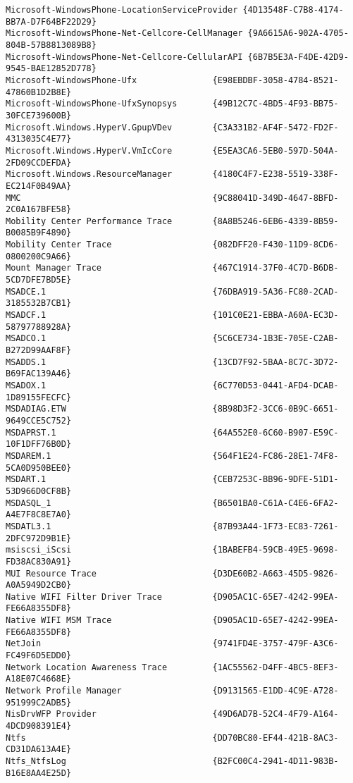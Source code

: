 \documentclass{report}
\begin{document}
\begin{lstlisting}[breaklines=true,basicstyle=\tiny]
Microsoft-WindowsPhone-LocationServiceProvider {4D13548F-C7B8-4174-BB7A-D7F64BF22D29}
Microsoft-WindowsPhone-Net-Cellcore-CellManager {9A6615A6-902A-4705-804B-57B8813089B8}
Microsoft-WindowsPhone-Net-Cellcore-CellularAPI {6B7B5E3A-F4DE-42D9-9545-BAE12852D778}
Microsoft-WindowsPhone-Ufx               {E98EBDBF-3058-4784-8521-47860B1D2B8E}
Microsoft-WindowsPhone-UfxSynopsys       {49B12C7C-4BD5-4F93-BB75-30FCE739600B}
Microsoft.Windows.HyperV.GpupVDev        {C3A331B2-AF4F-5472-FD2F-4313035C4E77}
Microsoft.Windows.HyperV.VmIcCore        {E5EA3CA6-5EB0-597D-504A-2FD09CCDEFDA}
Microsoft.Windows.ResourceManager        {4180C4F7-E238-5519-338F-EC214F0B49AA}
MMC                                      {9C88041D-349D-4647-8BFD-2C0A167BFE58}
Mobility Center Performance Trace        {8A8B5246-6EB6-4339-8B59-B0085B9F4890}
Mobility Center Trace                    {082DFF20-F430-11D9-8CD6-0800200C9A66}
Mount Manager Trace                      {467C1914-37F0-4C7D-B6DB-5CD7DFE7BD5E}
MSADCE.1                                 {76DBA919-5A36-FC80-2CAD-3185532B7CB1}
MSADCF.1                                 {101C0E21-EBBA-A60A-EC3D-58797788928A}
MSADCO.1                                 {5C6CE734-1B3E-705E-C2AB-B272D99AAF8F}
MSADDS.1                                 {13CD7F92-5BAA-8C7C-3D72-B69FAC139A46}
MSADOX.1                                 {6C770D53-0441-AFD4-DCAB-1D89155FECFC}
MSDADIAG.ETW                             {8B98D3F2-3CC6-0B9C-6651-9649CCE5C752}
MSDAPRST.1                               {64A552E0-6C60-B907-E59C-10F1DFF76B0D}
MSDAREM.1                                {564F1E24-FC86-28E1-74F8-5CA0D950BEE0}
MSDART.1                                 {CEB7253C-BB96-9DFE-51D1-53D966D0CF8B}
MSDASQL_1                                {B6501BA0-C61A-C4E6-6FA2-A4E7F8C8E7A0}
MSDATL3.1                                {87B93A44-1F73-EC83-7261-2DFC972D9B1E}
msiscsi_iScsi                            {1BABEFB4-59CB-49E5-9698-FD38AC830A91}
MUI Resource Trace                       {D3DE60B2-A663-45D5-9826-A0A5949D2CB0}
Native WIFI Filter Driver Trace          {D905AC1C-65E7-4242-99EA-FE66A8355DF8}
Native WIFI MSM Trace                    {D905AC1D-65E7-4242-99EA-FE66A8355DF8}
NetJoin                                  {9741FD4E-3757-479F-A3C6-FC49F6D5EDD0}
Network Location Awareness Trace         {1AC55562-D4FF-4BC5-8EF3-A18E07C4668E}
Network Profile Manager                  {D9131565-E1DD-4C9E-A728-951999C2ADB5}
NisDrvWFP Provider                       {49D6AD7B-52C4-4F79-A164-4DCD908391E4}
Ntfs                                     {DD70BC80-EF44-421B-8AC3-CD31DA613A4E}
Ntfs_NtfsLog                             {B2FC00C4-2941-4D11-983B-B16E8AA4E25D}

\end{lstlisting}
\end{document}
